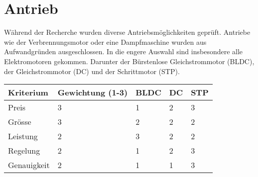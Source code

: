 \section{Antrieb}

Während der Recherche wurden diverse Antriebsmöglichkeiten geprüft.
Antriebe wie der Verbrennungsmotor oder eine Dampfmaschine wurden aus Aufwandgründen ausgeschlossen.
In die engere Auswahl sind insbesondere alle Elektromotoren gekommen.
Darunter der Bürstenlose Gleichstrommotor (BLDC), der Gleichstrommotor (DC) und der Schrittmotor (STP).


\begin{table}[h]
\begin{tabular}{|p{4.5cm}|p{3.5cm}|p{2cm}|p{2cm}|p{2cm}|}\hline
	
	\textbf{Kriterium}	& 	\textbf{Gewichtung (1-3)} & \textbf{BLDC} & \textbf{DC} & \textbf{STP}\\\hline
	{Preis}	& 	{3} & {1} & {2} & {3}\\\hline
	{Grösse}	& 	{3} & {2} & {2} & {2}\\\hline
	{Leistung}	& 	{2} & {3} & {2} & {2}\\\hline
	{Regelung}	& 	{2} & {1} & {2} & {3}\\\hline
	{Genauigkeit}	& 	{2} & {1} & {1} & {3}\\\hline
	
	
	
	
\end{tabular}\\
\end{table}